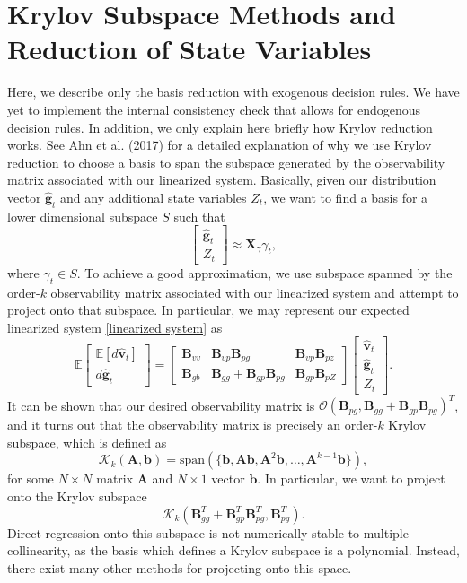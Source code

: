 \documentclass[12 pt, oneside]{article}
\theoremstyle{definition}
\theoremstyle{definition}
\theoremstyle{definition}
\newcommand{\bfb}{\mathbf{b}}
\newcommand{\bfg}{\mathbf{g}}
\newcommand{\bfv}{\mathbf{v}}
\newcommand{\bfX}{\mathbf{X}}
\newcommand{\bfA}{\mathbf{A}}
\newcommand{\bfB}{\mathbf{B}}
\newcommand{\E}{\mathbb{E}}
\newcommand{\Z}{\mathbb{Z}}
\newcommand{\calK}{\mathcal{K}}
\newcommand{\calO}{\mathcal{O}}
\begin{document}
\section{Krylov Subspace Methods and Reduction of State Variables}
Here, we describe only the basis reduction with exogenous decision rules. We have yet to implement the internal consistency check that allows for endogenous decision rules. In addition, we only explain here briefly how Krylov reduction works. See Ahn et al. (2017) for a detailed explanation of why we use Krylov reduction to choose a basis to span the subspace generated by the observability matrix associated with our linearized system. Basically, given our distribution vector $\hat{\bfg}_t$ and any additional state variables $Z_t$, we want to find a basis for a lower dimensional subspace $S$ such that
\[
\begin{bmatrix}
  \hat{\bfg}_t\\Z_t
\end{bmatrix} \approx \bfX_\gamma \gamma_t,
\]
where $\gamma_t\in S$. To achieve a good approximation, we use subspace spanned by the order-$k$ observability matrix associated with our linearized system and attempt to project onto that subspace. In particular, we may represent our expected linearized system \eqref{linearized system} as
\[ \E \begin{bmatrix}
    \E[d\hat{\bfv}_t]\\d\hat{\bfg}_t
  \end{bmatrix} =
  \begin{bmatrix}
    \bfB_{vv} & \bfB_{vp} \bfB_{pg} & \bfB_{vp}\bfB_{pz}\\
    \bfB_{gb} & \bfB_{gg} + \bfB_{gp}\bfB_{pg} & \bfB_{gp} \bfB_{pZ}
  \end{bmatrix}
  \begin{bmatrix}
    \hat{\bfv}_t\\\hat{\bfg}_t\\ Z_t
  \end{bmatrix}.
\]
It can be shown that our desired observability matrix is $\calO(\bfB_{pg}, \bfB_{gg} + \bfB_{gp}\bfB_{pg})^T$, and it turns out that the observability matrix is precisely an order-$k$ Krylov subspace, which is defined as
\[ \calK_k(\bfA,\bfb) = \text{span}(\{\bfb, \bfA\bfb, \bfA^2\bfb,\dots, \bfA^{k-1}\bfb\}), \]
for some $N\times N$ matrix $\bfA$ and $N\times 1$ vector $\bfb$. In particular, we want to project onto the Krylov subspace
\[\calK_k(\bfB_{gg}^T + \bfB_{gp}^T\bfB_{pg}^T, \bfB_{pg}^T).  \]
Direct regression onto this subspace is not numerically stable to multiple collinearity, as the basis which defines a Krylov subspace is a polynomial. Instead, there exist many other methods for projecting onto this space.
\end{document}
